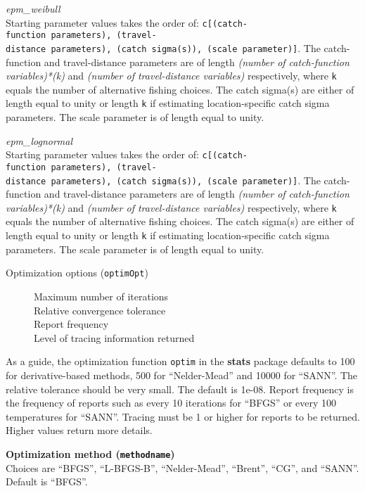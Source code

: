 \documentclass[
]{article}
\begin{document}
\emph{epm\_weibull}\\
Starting parameter values takes the order of: \texttt{c{[}(catch-function\ parameters),\ (travel-distance\ parameters),\ (catch\ sigma(s)),\ (scale\ parameter){]}}. The catch-function and travel-distance parameters are of length \emph{(number of catch-function variables)*(k)} and \emph{(number of travel-distance variables)} respectively, where \texttt{k} equals the number of alternative fishing choices. The catch sigma(s) are either of length equal to unity or length \texttt{k} if estimating location-specific catch sigma parameters. The scale parameter is of length equal to unity.

\emph{epm\_lognormal}\\
Starting parameter values takes the order of: \texttt{c{[}(catch-function\ parameters),\ (travel-distance\ parameters),\ (catch\ sigma(s)),\ (scale\ parameter){]}}. The catch-function and travel-distance parameters are of length \emph{(number of catch-function variables)*(k)} and \emph{(number of travel-distance variables)} respectively, where \texttt{k} equals the number of alternative fishing choices. The catch sigma(s) are either of length equal to unity or length \texttt{k} if estimating location-specific catch sigma parameters. The scale parameter is of length equal to unity.

\begin{description}
\item[Optimization options (\texttt{optimOpt})]
Maximum number of iterations\\
Relative convergence tolerance\\
Report frequency\\
Level of tracing information returned
\end{description}

As a guide, the optimization function \texttt{optim} in the \textbf{stats} package defaults to 100 for derivative-based methods, 500 for ``Nelder-Mead'' and 10000 for ``SANN''. The relative tolerance should be very small. The default is 1e-08. Report frequency is the frequency of reports such as every 10 iterations for ``BFGS'' or every 100 temperatures for ``SANN''. Tracing must be 1 or higher for reports to be returned. Higher values return more details.

\textbf{Optimization method (\texttt{methodname})}\\
Choices are ``BFGS'', ``L-BFGS-B'', ``Nelder-Mead'', ``Brent'', ``CG'', and ``SANN''. Default is ``BFGS''.
\end{document}
